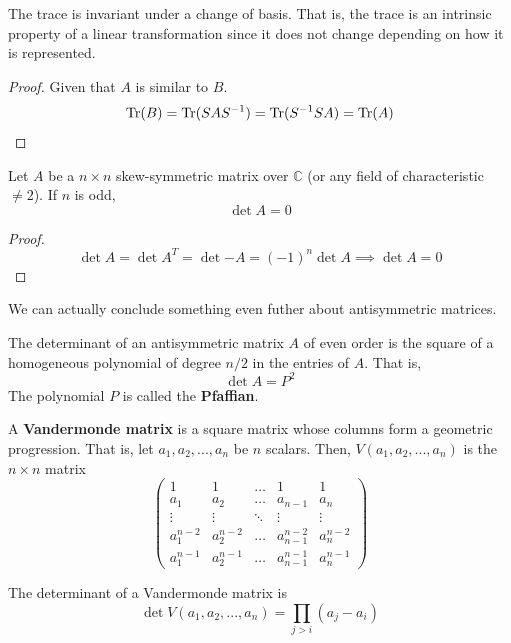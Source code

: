   \begin{corollary}
  The trace is invariant under a change of basis. That is, the trace is an intrinsic property of a linear transformation since it does not change depending on how it is represented. 
  \end{corollary}
  \begin{proof}
  Given that $A$ is similar to $B$. 
  \[\operatorname{Tr}(B) = \operatorname{Tr}(S A S^{-1}) = \operatorname{Tr}(S^{-1} S A) = \operatorname{Tr}(A) \]
  \end{proof}

  \begin{theorem}
  Let $A$ be a $n \times n$ skew-symmetric matrix over $\mathbb{C}$ (or any field of characteristic $\neq 2$). If $n$ is odd, 
  \[\det{A} = 0 \]
  \end{theorem}
  \begin{proof}
  \[\det{A} = \det{A^T} = \det{-A} = (-1)^n \det{A} \implies \det{A} = 0 \]
  \end{proof}

  We can actually conclude something even futher about antisymmetric matrices. 

  \begin{theorem}
  The determinant of an antisymmetric matrix $A$ of even order is the square of a homogeneous polynomial of degree $n/2$ in the entries of $A$. That is, 
  \[\det{A} = P^2\]
  The polynomial $P$ is called the \textbf{Pfaffian}. 
  \end{theorem}

  \begin{definition}
  A \textbf{Vandermonde matrix} is a square matrix whose columns form a geometric progression. That is, let $a_1, a_2, ..., a_n$ be $n$ scalars. Then, $V(a_1, a_2, ..., a_n)$ is the $n \times n$ matrix
  \[\begin{pmatrix}
  1&1&\ldots&1&1 \\
  a_1&a_2&\ldots&a_{n-1}&a_n\\
  \vdots&\vdots&\ddots&\vdots&\vdots\\
  a_1^{n-2}&a_2^{n-2}&\ldots&a_{n-1}^{n-2}&a_n^{n-2}\\
  a_1^{n-1}&a_2^{n-1}&\ldots&a_{n-1}^{n-1}&a_n^{n-1}
  \end{pmatrix}\]
  \end{definition}

  \begin{theorem}
  The determinant of a Vandermonde matrix is
  \[\det{V(a_1, a_2, ..., a_n)} = \prod_{j>i} (a_j - a_i)\]
  \end{theorem}

